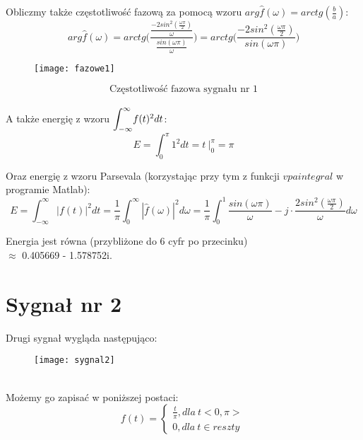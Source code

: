 \documentclass[11pt,a4paper]{article}
\numberwithin{liczba1}{liczba2}
\begin{document}
Obliczmy także częstotliwość fazową za pomocą wzoru $ arg \hat{f} (\omega) = arctg(\frac{b}{a}) $:
\begin{equation}
arg \hat{f} (\omega) = arctg \Bigg(\frac{\frac{-2sin^2(\frac{\omega \pi}{2})}{\omega}}{\frac{sin(\omega \pi)}{\omega}}\Bigg) = arctg \Bigg(\frac{-2sin^2(\frac{\omega \pi}{2})} {sin(\omega \pi)}\Bigg)
\label{fazowa}
\end{equation}
\pagebreak

\begin{figure}[h]
\centering
\texttt{[image: fazowe1]}
\end{figure}
\[
\text{Częstotliwość fazowa sygnału nr 1}
\] \\

A także energię z wzoru $ \mathlarger{\int_{-\infty}^{\infty}} f(t)^2 dt $:
\begin{equation}
E = \int_{0}^{\pi} 1^2 dt = t \ \Bigg|^\pi_0 = \pi
\label{energia}
\end{equation}

Oraz energię z wzoru Parsevala (korzystając przy tym z funkcji $ vpaintegral $ w programie Matlab): \\
\begin{equation}
E = \int_{-\infty}^{\infty} |f(t)|^2 dt = \frac{1}{\pi} \int_{0}^{\infty} |\hat{f}(\omega)|^2 d\omega = \frac{1}{\pi} \int_{0}^{1} \frac{sin(\omega \pi)}{\omega} - j \cdot \frac{2sin^2(\frac{\omega \pi}{2})}{\omega} d\omega
\label{parseval}
\end{equation}

Energia jest równa (przybliżone do 6 cyfr po przecinku) \\ $ \approx $ 
0.405669 - 1.578752i.
\pagebreak

\section{Sygnał nr 2}
Drugi sygnał wygląda następująco:
\begin{figure}[h]
\centering
\texttt{[image: sygnal2]}
\end{figure} \\

Możemy go zapisać w poniższej postaci:
\[
    f(t) =\left\{
                \begin{array}{ll}
                  \frac{t}{\pi}, dla\ t <0,\pi> \\
                  0, dla\ t \in reszty
                \end{array}
\label{sygnal2klamra}
\tag{2.1}
              \right.
\]
\end{document}
